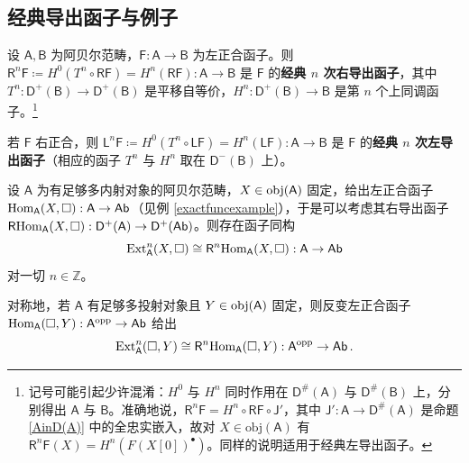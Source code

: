 \subsection{经典导出函子与例子}\label{ch3.3}


\begin{Def}\label{classicalderivedfunc}
	设 $\mathsf{A}, \mathsf{B}$ 为阿贝尔范畴，$\mathsf{F}:\mathsf{A}\rightarrow\mathsf{B}$ 为左正合函子。则 $\mathsf{R}^n\mathsf{F}\coloneqq H^0(T^n\circ\mathsf{RF}) = H^n(\mathsf{RF}):\mathsf{A}\rightarrow\mathsf{B}$ 是 $\mathsf{F}$ 的\textbf{经典 $n$ 次右导出函子}，其中 $T^n:\mathsf{D^+(B)}\rightarrow\mathsf{D^+(B)}$ 是平移自等价，$H^n:\mathsf{D^+(B)}\rightarrow\mathsf{B}$ 是第 $n$ 个上同调函子。\footnote{记号可能引起少许混淆：$H^0$ 与 $H^n$ 同时作用在 $\mathsf{D^\#\!(A)}$ 与 $\mathsf{D^\#\!(B)}$ 上，分别得出 $\mathsf{A}$ 与 $\mathsf{B}$。准确地说，$\mathsf{R}^n\mathsf{F}=H^n\circ\mathsf{RF}\circ\mathsf{J'}$，其中 $\mathsf{J'}:\mathsf{A}\rightarrow\mathsf{D^\#\!(A)}$ 是命题 \ref{AinD(A)} 中的全忠实嵌入，故对 $X\in\text{obj}(\mathsf{A})$ 有 $\mathsf{R}^n\mathsf{F}(X)=H^n(F(X[0])^\bullet)$。同样的说明适用于经典左导出函子。}
	
	若 $\mathsf{F}$ 右正合，则 $\mathsf{L}^n\mathsf{F}\coloneqq H^0(T^n\circ\mathsf{LF}) = H^n(\mathsf{LF}):\mathsf{A}\rightarrow\mathsf{B}$ 是 $\mathsf{F}$ 的\textbf{经典 $n$ 次左导出函子}（相应的函子 $T^n$ 与 $H^n$ 取在 $\mathsf{D^-(B)}$ 上）。
\end{Def}

\begin{Pro}\label{ExtRHom}
	设 $\mathsf{A}$ 为有足够多内射对象的阿贝尔范畴，$X\in\textup{obj}(\mathsf{A})$ 固定，给出左正合函子 $\textup{Hom}_\mathsf{A}(X,\square):\mathsf{A}\rightarrow\mathsf{Ab}$（见例 \ref{exactfuncexample}），于是可以考虑其右导出函子 $\mathsf{R}\textup{Hom}_\mathsf{A}(X,\square):\mathsf{D^+(A)}\rightarrow\mathsf{D^+(Ab)}$。则存在函子同构 \begin{equation}\label{ExtRHomeq}
		\textup{Ext}_\mathsf{A}^n(X,\square)\cong\mathsf{R}^n\textup{Hom}_\mathsf{A}(X,\square):\mathsf{A}\rightarrow\mathsf{Ab}
	\end{equation}
	对一切 $n\in\mathbb{Z}$。
	
	对称地，若 $\mathsf{A}$ 有足够多投射对象且 $Y\in\textup{obj}(\mathsf{A})$ 固定，则反变左正合函子 $\textup{Hom}_\mathsf{A}(\square,Y):\mathsf{A}^\textup{opp}\rightarrow\mathsf{Ab}$ 给出
	\begin{equation}\label{eqExtRHom}
		\textup{Ext}_\mathsf{A}^n(\square,Y)\cong\mathsf{R}^n\textup{Hom}_\mathsf{A}(\square, Y):\mathsf{A^\textup{opp}}\rightarrow\mathsf{Ab}\,.
	\end{equation}  
\end{Pro}

